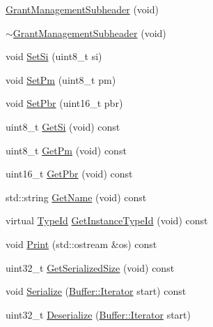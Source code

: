 \begin{DoxyCompactItemize}
\item 
\hyperlink{classns3_1_1GrantManagementSubheader_a73357d517e397bd8f1a7c489850f5dca}{Grant\+Management\+Subheader} (void)
\item 
\hyperlink{classns3_1_1GrantManagementSubheader_a036e1fdd1546e8d7a84fbc5e65e03d6c}{$\sim$\+Grant\+Management\+Subheader} (void)
\item 
void \hyperlink{classns3_1_1GrantManagementSubheader_a65cd0472dcc19e2acf5d6927ad43ba67}{Set\+Si} (uint8\+\_\+t si)
\item 
void \hyperlink{classns3_1_1GrantManagementSubheader_a6995ab99420456e1d5e56da111dc56f5}{Set\+Pm} (uint8\+\_\+t pm)
\item 
void \hyperlink{classns3_1_1GrantManagementSubheader_ac1bba64c1d6ec9a6c9e8832307d1f167}{Set\+Pbr} (uint16\+\_\+t pbr)
\item 
uint8\+\_\+t \hyperlink{classns3_1_1GrantManagementSubheader_a624ddadcc7afdad0f86fc2916371029e}{Get\+Si} (void) const 
\item 
uint8\+\_\+t \hyperlink{classns3_1_1GrantManagementSubheader_af6e362ae284a54f5aa093620b2896635}{Get\+Pm} (void) const 
\item 
uint16\+\_\+t \hyperlink{classns3_1_1GrantManagementSubheader_af9e53649f078f6bb64b04fd621a92251}{Get\+Pbr} (void) const 
\item 
std\+::string \hyperlink{classns3_1_1GrantManagementSubheader_a1fb82b74e7eb77764999ec8a106fb87a}{Get\+Name} (void) const 
\item 
virtual \hyperlink{classns3_1_1TypeId}{Type\+Id} \hyperlink{classns3_1_1GrantManagementSubheader_ae21ceaf00829215059ed8a044d840491}{Get\+Instance\+Type\+Id} (void) const 
\item 
void \hyperlink{classns3_1_1GrantManagementSubheader_ae23e1489158a9597a7bc796a2f8a3fc2}{Print} (std\+::ostream \&os) const 
\item 
uint32\+\_\+t \hyperlink{classns3_1_1GrantManagementSubheader_a96f788ee546276446e91de9f5c49638c}{Get\+Serialized\+Size} (void) const 
\item 
void \hyperlink{classns3_1_1GrantManagementSubheader_a2da78f92df8671ba9bc2db53df992227}{Serialize} (\hyperlink{classns3_1_1Buffer_1_1Iterator}{Buffer\+::\+Iterator} start) const 
\item 
uint32\+\_\+t \hyperlink{classns3_1_1GrantManagementSubheader_a77ff8d881561013458f87194b8441c3d}{Deserialize} (\hyperlink{classns3_1_1Buffer_1_1Iterator}{Buffer\+::\+Iterator} start)
\end{DoxyCompactItemize}
